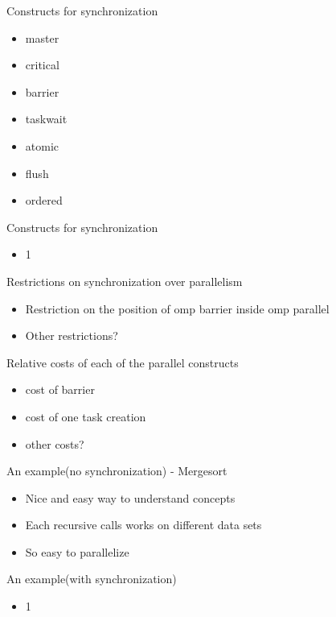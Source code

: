 \documentclass[14pt]{beamer}
\begin{document}
\begin{frame}{Constructs for synchronization}
\begin{itemize}
\item master
\item critical
\item barrier
\item taskwait
\item atomic
\item flush
\item ordered
\end{itemize}
\end{frame}

\begin{frame}{Constructs for synchronization}
\begin{itemize}
\item 1
\end{itemize}
\end{frame}

\begin{frame}{Restrictions on synchronization over parallelism}
\begin{itemize}
\item Restriction on the position of omp barrier inside omp parallel
\item Other restrictions?
\end{itemize}
\end{frame}

\begin{frame}{Relative costs of each of the parallel constructs}
\begin{itemize}
\item cost of barrier
\item cost of one task creation
\item other costs?
\end{itemize}
\end{frame}

\begin{frame}{An example(no synchronization) - Mergesort}
\begin{itemize}
\item Nice and easy way to understand concepts
\item Each recursive calls works on different data sets
\item So easy to parallelize
\end{itemize}
\end{frame}

\begin{frame}{An example(with synchronization)}
\begin{itemize}
\item 1
\end{itemize}
\end{frame}
\end{document}
